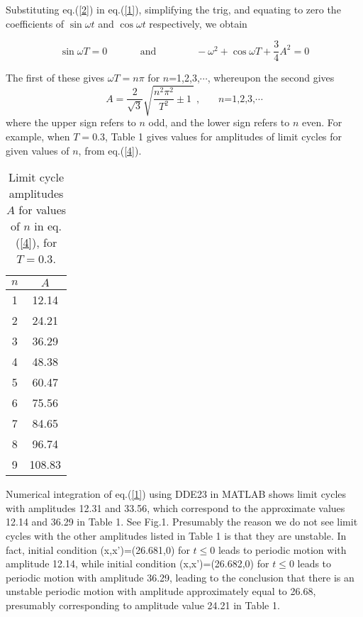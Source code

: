 \documentclass[12pt]{article}
\begin{document}
Substituting eq.(\ref{2}) in eq.(\ref{1}), simplifying the trig, and equating to zero the coefficients of $\sin \omega t$ and $\cos\omega t$ respectively, we obtain

\begin{equation}
 \sin \omega T = 0 \mbox{~~~~~~~~~~and ~~~~~~~~~~~}-\omega^2+\cos\omega T +\frac{3}{4} A^2 = 0
\label{3} 
\end{equation}

The first of these gives $\omega T=n\pi$ for $n$=1,2,3,$\cdots$, whereupon the second gives
\begin{equation}
A=\frac{2}{\sqrt{3}}\sqrt{\frac{n^2\pi^2}{T^2}\pm 1~}~,~~~~~~~~\mbox{$n$=1,2,3,$\cdots$}
\label{4} 
\end{equation}
where the upper sign refers to $n$ odd, and the lower sign refers to $n$ even.
For example, when $T=0.3$, Table 1 gives values for amplitudes of limit cycles for given values of $n$, from eq.(\ref{4}).

\begin{table}	
		\caption{Limit cycle amplitudes $A$ for values of $n$ in eq.(\ref{4}), for $T=0.3$.}
\hspace*{2.5 in}	
\begin{tabular}[t]{|c|c|}
		\hline
			$n$ & $A$\\
			\hline
		1& 12.14\\
		2& 24.21\\
		3& 36.29\\
		4& 48.38\\
		5& 60.47\\
		6& 75.56\\
		7& 84.65\\
		8& 96.74\\
		9& 108.83\\
		\hline
		\end{tabular}
\end{table}
Numerical integration of eq.(\ref{1}) using DDE23 in MATLAB shows limit cycles with amplitudes 12.31 and 33.56, which correspond to the approximate values 12.14 and 36.29 in Table 1.  See Fig.1.  Presumably the reason we do not see limit cycles with the other amplitudes listed in Table 1 is that they are unstable.  In fact, initial condition (x,x')=(26.681,0) for $t\leq 0$ leads to periodic motion with amplitude 12.14, while  initial condition (x,x')=(26.682,0) for $t\leq 0$ leads to periodic motion with amplitude 36.29, leading to the conclusion that there is an unstable periodic motion with amplitude approximately equal to 26.68, presumably corresponding to amplitude value 24.21 in Table 1.
\end{document}
